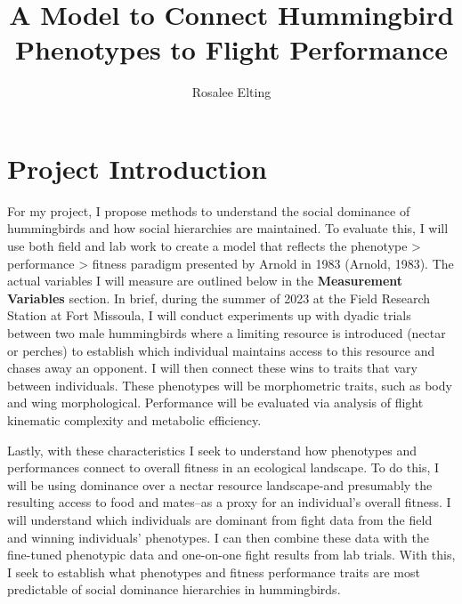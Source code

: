 \documentclass[
  letterpaper,
  DIV=11,
  numbers=noendperiod]{scrartcl}
\title{A Model to Connect Hummingbird Phenotypes to Flight Performance}
\author{Rosalee Elting}
\date{}
\renewcommand*\contentsname{Table of contents}
\newcommand\contentsname{Table of contents}
\begin{document}
\maketitle
\ifdefined\Shaded\renewenvironment{Shaded}{\begin{tcolorbox}[borderline west={3pt}{0pt}{shadecolor}, sharp corners, frame hidden, boxrule=0pt, interior hidden, breakable, enhanced]}{\end{tcolorbox}}\fi

\renewcommand*\contentsname{Table of contents}
{
\hypersetup{linkcolor=}
\setcounter{tocdepth}{3}
\tableofcontents
}
\hypertarget{project-introduction}{%
\section{Project Introduction}\label{project-introduction}}

For my project, I propose methods to understand the social dominance of
hummingbirds and how social hierarchies are maintained. To evaluate
this, I will use both field and lab work to create a model that reflects
the phenotype \textgreater{} performance \textgreater{} fitness paradigm
presented by Arnold in 1983 (Arnold, 1983). The actual variables I will
measure are outlined below in the \textbf{Measurement Variables}
section. In brief, during the summer of 2023 at the Field Research
Station at Fort Missoula, I will conduct experiments up with dyadic
trials between two male hummingbirds where a limiting resource is
introduced (nectar or perches) to establish which individual maintains
access to this resource and chases away an opponent. I will then connect
these wins to traits that vary between individuals. These phenotypes
will be morphometric traits, such as body and wing morphological.
Performance will be evaluated via analysis of flight kinematic
complexity and metabolic efficiency.

Lastly, with these characteristics I seek to understand how phenotypes
and performances connect to overall fitness in an ecological landscape.
To do this, I will be using dominance over a nectar resource
landscape-and presumably the resulting access to food and mates--as a
proxy for an individual's overall fitness. I will understand which
individuals are dominant from fight data from the field and winning
individuals' phenotypes. I can then combine these data with the
fine-tuned phenotypic data and one-on-one fight results from lab trials.
With this, I seek to establish what phenotypes and fitness performance
traits are most predictable of social dominance hierarchies in
hummingbirds.
\end{document}
